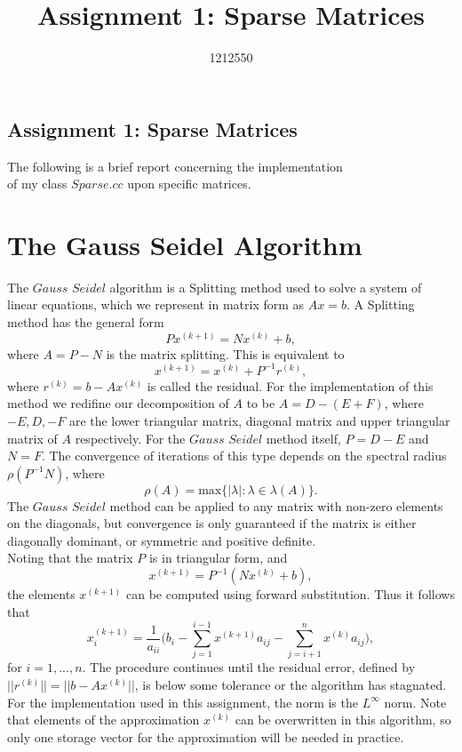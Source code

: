 \documentclass[10pt]{article}
\begin{document}
\title{Assignment 1: Sparse Matrices}
\author{1212550}
\begin{center}
\section*{Assignment 1: Sparse Matrices}


The following is a brief report concerning the implementation\\ of my class $\textit{Sparse.cc}$ upon specific matrices.\\
\end{center}

\section{The Gauss Seidel Algorithm}

The  $\textit{Gauss Seidel}$  algorithm is a Splitting method used to solve a system of linear equations, which we represent in matrix form as $Ax=b$. A Splitting method has the general form
\[ Px^{(k+1)} = Nx^{(k)} + b, \]
where $A = P - N$ is the matrix splitting. This is equivalent to
\[ x^{(k+1)} = x^{(k)} + P^{-1}r^{(k)}, \]
where $r^{(k)} = b - Ax^{(k)}$ is called the residual. For the implementation of this method we redifine our decomposition of $A$ to be $A = D - (E+F)$, where $-E,D,-F$ are the lower triangular matrix, diagonal matrix and upper triangular matrix of $A$ respectively. For the $\textit{Gauss Seidel}$ method itself, $P = D - E$ and $N = F$. The convergence of iterations of this type depends on the spectral radius $\rho(P^{-1}N)$, where
\[ \rho(A) = \text{max}\{ |\lambda|: \lambda \in \lambda(A) \}. \]
The $\textit{Gauss Seidel}$ method can be applied to any matrix with non-zero elements on the diagonals, but convergence is only guaranteed if the matrix is either diagonally dominant, or symmetric and positive definite. \\

Noting that the matrix $P$ is in triangular form, and
\[ x^{(k+1)} = P^{-1}(Nx^{(k)} + b),\]
the elements $x^{(k+1)}$ can be computed using forward substitution. Thus it follows that
\[ x_i^{(k+1)} = \frac{1}{a_{ii}} \Big( b_i - \sum_{j=1}^{i-1}x^{(k+1)}a_{ij} - \sum_{j=i+1}^{n}x^{(k)}a_{ij} \Big), \]
for $i = 1,...,n$. The procedure continues until the residual error, defined by $||r^{(k)}|| = ||b- A x^{(k)}||$, is below some tolerance or the algorithm has stagnated. For the implementation used in this assignment, the norm is the $L^{\infty}$ norm. Note that elements of the approximation $x^{(k)}$ can be overwritten in this algorithm, so only one storage vector for the approximation will be needed in practice. \\
\end{document}
